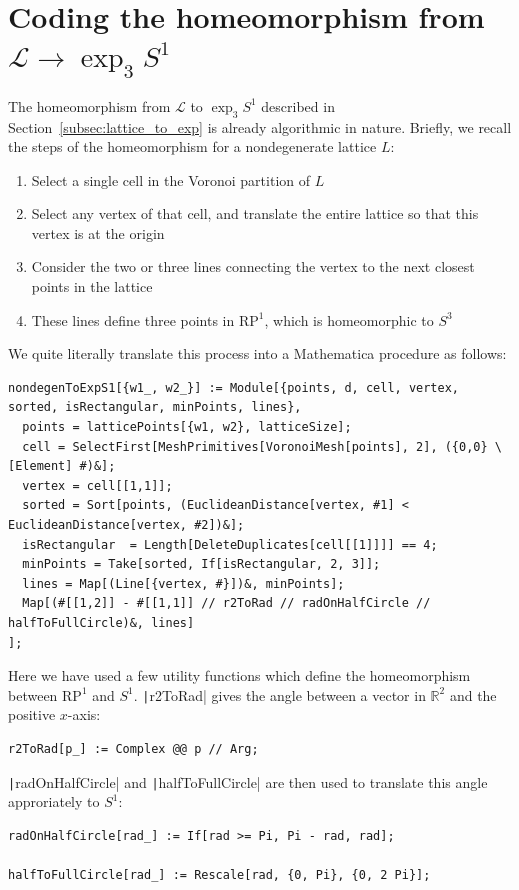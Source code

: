 \documentclass[12pt,twoside]{reedthesis}
\theoremstyle{definition}
\newcommand{\R}{\mathbb{R}}
\newcommand{\LS}{\mathcal{L}}
\begin{document}
\section{Coding the homeomorphism from $\LS \to \exp_3 S^1$}

The homeomorphism from $\LS$ to $\exp_3 S^1$ described in Section~\ref{subsec:lattice_to_exp} is already algorithmic in nature.
Briefly, we recall the steps of the homeomorphism for a nondegenerate lattice $L$:
\begin{enumerate}
  \item Select a single cell in the Voronoi partition of $L$
  \item Select any vertex of that cell, and translate the entire lattice so that this vertex is at the origin
  \item Consider the two or three lines connecting the vertex to the next closest points in the lattice
  \item These lines define three points in $\mathrm{RP}^1$, which is homeomorphic to $S^3$
\end{enumerate}
We quite literally translate this process into a Mathematica procedure as follows:
\begin{verbatim}
nondegenToExpS1[{w1_, w2_}] := Module[{points, d, cell, vertex, sorted, isRectangular, minPoints, lines},
  points = latticePoints[{w1, w2}, latticeSize];
  cell = SelectFirst[MeshPrimitives[VoronoiMesh[points], 2], ({0,0} \[Element] #)&];
  vertex = cell[[1,1]];
  sorted = Sort[points, (EuclideanDistance[vertex, #1] < EuclideanDistance[vertex, #2])&];
  isRectangular  = Length[DeleteDuplicates[cell[[1]]]] == 4;
  minPoints = Take[sorted, If[isRectangular, 2, 3]];
  lines = Map[(Line[{vertex, #}])&, minPoints];
  Map[(#[[1,2]] - #[[1,1]] // r2ToRad // radOnHalfCircle // halfToFullCircle)&, lines]
];
\end{verbatim}
Here we have used a few utility functions which define the homeomorphism between $\mathrm{RP}^1$ and $S^1$.
\texttt|r2ToRad| gives the angle between a vector in $\R^2$ and the positive $x$-axis:
\begin{verbatim}
r2ToRad[p_] := Complex @@ p // Arg;
\end{verbatim}
\texttt|radOnHalfCircle| and \texttt|halfToFullCircle| are then used to translate this angle approriately to $S^1$:
\begin{verbatim}
radOnHalfCircle[rad_] := If[rad >= Pi, Pi - rad, rad];

halfToFullCircle[rad_] := Rescale[rad, {0, Pi}, {0, 2 Pi}];
\end{verbatim}
\end{document}
